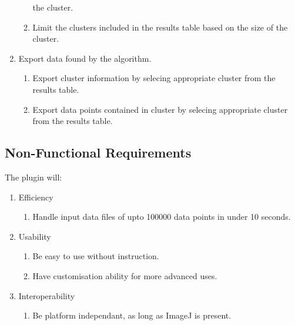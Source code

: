\begin{enumerate}
\begin{enumerate}
				the cluster.
			\item Limit the clusters included in the results table based on the
				size of the cluster.
		\end{enumerate}
	\item Export data found by the algorithm.
		\begin{enumerate}
			\item Export cluster information by selecing appropriate cluster
				from the results table.
			\item Export data points contained in cluster by selecing
				appropriate cluster from the results table.
		\end{enumerate}
\end{enumerate}

\subsection{Non-Functional Requirements}
\label{sub:non_functional_requirements}

The plugin will:

\begin{enumerate}
	\item Efficiency
		\begin{enumerate}
			\item Handle input data files of upto \num{100000} data points in
				under 10 seconds.
		\end{enumerate}
	\item Usability
		\begin{enumerate}
			\item Be easy to use without instruction.
			\item Have customisation ability for more advanced uses.
		\end{enumerate}
	\item Interoperability
		\begin{enumerate}
			\item Be platform independant, as long as ImageJ is present.
		\end{enumerate}
\end{enumerate}

\restoregeometry
